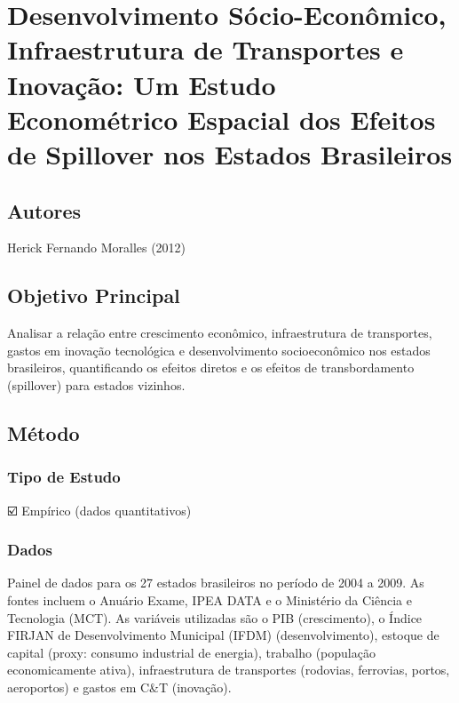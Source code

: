 \documentclass[12pt]{article}
\begin{document}
\section{Desenvolvimento Sócio-Econômico, Infraestrutura de Transportes e Inovação: Um Estudo Econométrico Espacial dos Efeitos de Spillover nos Estados Brasileiros}

\subsection*{Autores}
Herick Fernando Moralles (2012)

\subsection*{Objetivo Principal}
Analisar a relação entre crescimento econômico, infraestrutura de transportes, gastos em inovação tecnológica e desenvolvimento socioeconômico nos estados brasileiros, quantificando os efeitos diretos e os efeitos de transbordamento (spillover) para estados vizinhos.

\subsection*{Método}

\subsubsection*{Tipo de Estudo}
☑️ Empírico (dados quantitativos)

\subsubsection*{Dados}
Painel de dados para os 27 estados brasileiros no período de 2004 a 2009. As fontes incluem o Anuário Exame, IPEA DATA e o Ministério da Ciência e Tecnologia (MCT). As variáveis utilizadas são o PIB (crescimento), o Índice FIRJAN de Desenvolvimento Municipal (IFDM) (desenvolvimento), estoque de capital (proxy: consumo industrial de energia), trabalho (população economicamente ativa), infraestrutura de transportes (rodovias, ferrovias, portos, aeroportos) e gastos em C\&T (inovação).
\end{document}
